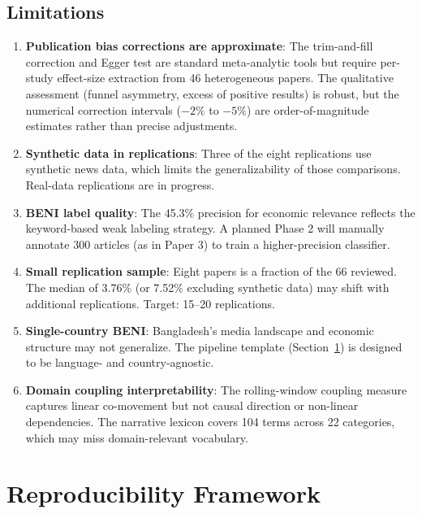 \documentclass[11pt]{article}
\begin{document}
\subsection{Limitations}

\begin{enumerate}
\item \textbf{Publication bias corrections are approximate}: The trim-and-fill correction and Egger test are standard meta-analytic tools but require per-study effect-size extraction from 46 heterogeneous papers. The qualitative assessment (funnel asymmetry, excess of positive results) is robust, but the numerical correction intervals (\(-2\%\) to \(-5\%\)) are order-of-magnitude estimates rather than precise adjustments.

\item \textbf{Synthetic data in replications}: Three of the eight replications use synthetic news data, which limits the generalizability of those comparisons. Real-data replications are in progress.

\item \textbf{BENI label quality}: The 45.3\% precision for economic relevance reflects the keyword-based weak labeling strategy. A planned Phase 2 will manually annotate 300 articles (as in Paper 3) to train a higher-precision classifier.

\item \textbf{Small replication sample}: Eight papers is a fraction of the 66 reviewed. The median of 3.76\% (or 7.52\% excluding synthetic data) may shift with additional replications. Target: 15--20 replications.

\item \textbf{Single-country BENI}: Bangladesh's media landscape and economic structure may not generalize. The pipeline template (Section~\ref{sec:template}) is designed to be language- and country-agnostic.

\item \textbf{Domain coupling interpretability}: The rolling-window coupling measure captures linear co-movement but not causal direction or non-linear dependencies. The narrative lexicon covers 104 terms across 22 categories, which may miss domain-relevant vocabulary.
\end{enumerate}

\section{Reproducibility Framework}\label{sec:template}
\end{document}

